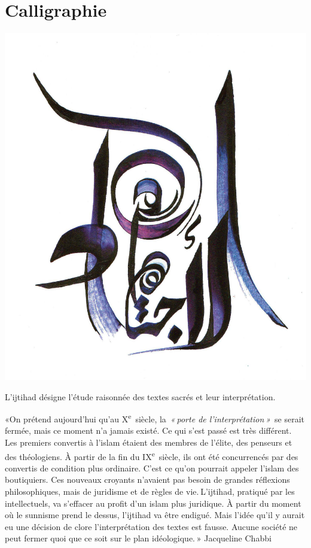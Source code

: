 \section{Calligraphie}

\includegraphics[width=\textwidth]{Images/image009.png}

\begin{Def}[iǧtihād]
L'ijtihad désigne l'étude raisonnée des textes sacrés et leur
interprétation.
\end{Def}
\begin{cite}
«On prétend aujourd'hui qu'au
X\textsuperscript{e}~siècle, la~\emph{« porte de l'interprétation »}~se
serait fermée, mais ce moment n'a jamais existé. Ce qui s'est passé est
très différent. Les premiers convertis à l'islam étaient des membres de
l'élite, des penseurs et des théologiens. À partir de la fin du
IX\textsuperscript{e}~siècle, ils ont été concurrencés par des convertis
de condition plus ordinaire. C'est ce qu'on pourrait appeler l'islam des
boutiquiers. Ces nouveaux croyants n'avaient pas besoin de grandes
réflexions philosophiques, mais de juridisme et de règles de
vie. L'ijtihad, pratiqué par les intellectuels, va s'effacer au profit
d'un islam plus juridique. À partir du moment où le sunnisme prend le
dessus, l'ijtihad va être endigué. Mais l'idée qu'il y aurait eu une
décision de clore l'interprétation des textes est fausse. Aucune société
ne peut fermer quoi que ce soit sur le plan idéologique. » Jacqueline Chabbi
\end{cite}


